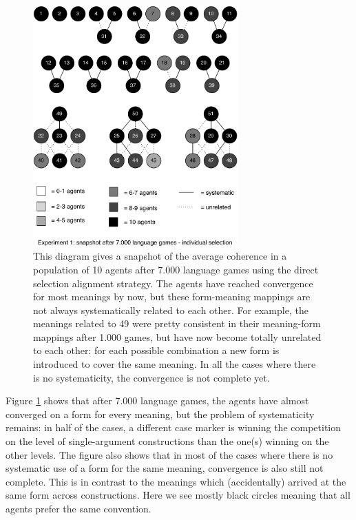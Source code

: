 \begin{figure}[p]
\centerline{\includegraphics[width=0.7\textwidth]{Chapter4/figs/direct-coherence-no-analogy-7000}}
  \caption[Experiment 1: snapshot after 7.000 games]{This diagram gives a snapshot of the average coherence in a population of 10 agents after 7.000 language games using the direct selection alignment strategy. The agents have reached convergence for most meanings by now, but these form-meaning mappings are not always systematically related to each other. For example, the meanings related to 49 were pretty consistent in their meaning-form mappings after 1.000 games, but have now become totally unrelated to each other: for each possible combination a new form is introduced to cover the same meaning. In all the cases where there is no systematicity, the convergence is not complete yet.}
   \label{f:1-coherence-7000}
\end{figure}

Figure \ref{f:1-coherence-7000} shows that after 7.000 language games, the agents have almost converged on a form for every meaning, but the problem of systematicity remains: in half of the cases, a different case marker is winning the competition on the level of single-argument constructions than the one(s) winning on the other levels. The figure also shows that in most of the cases where there is no systematic use of a form for the same meaning, convergence is also still not complete. This is in contrast to the meanings which (accidentally) arrived at the same form across constructions. Here we see mostly black circles meaning that all agents prefer the same convention.


